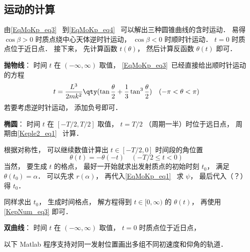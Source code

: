 \subsection{运动的计算}
由\autoref{EqMoKp_eq3}~ 到\autoref{EqMoKp_eq4}~ 可以解出三种圆锥曲线的含时运动． 易得 $\cos\beta > 0$ 时质点绕中心天体逆时针运动， $\cos\beta < 0$ 时顺时针运动． $t=0$ 时质点位于近日点． 接下来， 先计算函数 $t(\theta)$， 然后计算反函数 $\theta(t)$ 即可．

\textbf{抛物线}： 时间 $t$ 在 $(-\infty,\infty)$ 取值， \autoref{EqMoKp_eq3}~已经直接给出顺时针运动的方程
\begin{equation}
t = \frac{L^3}{2mk^2} \qty(\tan\frac{\theta}{2} +  \frac{1}{3}\tan^3 \frac{\theta}{2}) \quad (-\pi<\theta<\pi)
\end{equation}
若要考虑逆时针运动， 添加负号即可．



\textbf{椭圆}： 时间 $t$ 在 $[-T/2,T/2]$ 取值， $t=T/2$ （周期一半）时位于远日点， 周期由\autoref{Keple2_eq1}~ 计算． 


 根据对称性， 可以继续数值计算出 $t\in[-T/2,0]$ 时间段的角位置
\begin{equation}\label{KepNum_eq3}
\theta(t) = -\theta(-t) \quad (-T/2\leqslant t < 0)
\end{equation}
当然， 要生成 $t$ 的格点， 最好一开始就求出发射质点的初始时刻 $t_0$， 满足 $\theta(t_0) = \alpha$． 可以先求 $r(\alpha)$， 再代入\autoref{EqMoKp_eq1}~ 求 $\psi$， 最后代入（？） 得 $t_0$．

 同样求出 $t_0$， 生成时间格点， 解方程得到 $t\in[0,\infty)$ 的 $\theta(t)$， 再使用\autoref{KepNum_eq3} 即可．

\textbf{双曲线}： 时间 $t$ 在 $(-\infty,\infty)$ 取值， $t=0$ 时质点位于近日点，

以下 Matlab 程序支持对同一发射位置画出多组不同初速度和仰角的轨道．

